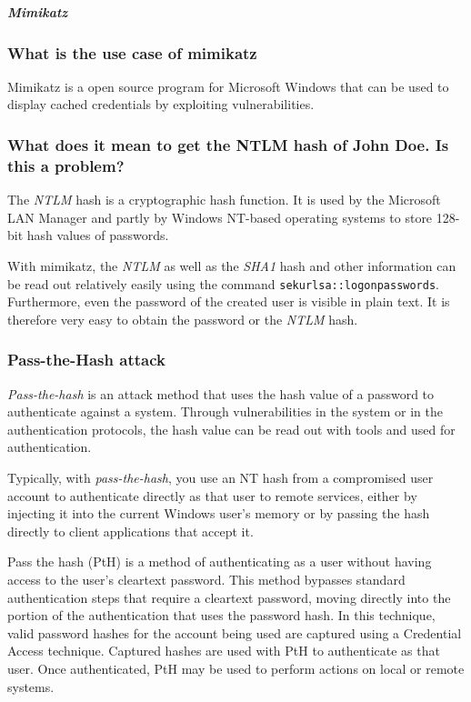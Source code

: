 \subparagraph{Mimikatz}
\subsubsection{What is the use case of mimikatz}
Mimikatz is a open source program for Microsoft Windows that can be used to display cached credentials by exploiting vulnerabilities.

\subsubsection{What does it mean to get the NTLM hash of John Doe. Is this a problem?}
The \textit{NTLM} hash is a cryptographic hash function. It is used by the Microsoft LAN Manager and partly by Windows NT-based operating systems to store 128-bit hash values of passwords.

With mimikatz, the \textit{NTLM} as well as the \textit{SHA1} hash and other information can be read out relatively easily using the command \lstinline|sekurlsa::logonpasswords|. Furthermore, even the password of the created user is visible in plain text. It is therefore very easy to obtain the password or the \textit{NTLM} hash.

\subsubsection{Pass-the-Hash attack}
\textit{Pass-the-hash} is an attack method that uses the hash value of a password to authenticate against a system. Through vulnerabilities in the system or in the authentication protocols, the hash value can be read out with tools and used for authentication.

Typically, with \textit{pass-the-hash}, you use an NT hash from a compromised user account to authenticate directly as that user to remote services, either by injecting it into the current Windows user's memory or by passing the hash directly to client applications that accept it.

Pass the hash (PtH) is a method of authenticating as a user without having access to the user's cleartext password. This method bypasses standard authentication steps that require a cleartext password, moving directly into the portion of the authentication that uses the password hash. In this technique, valid password hashes for the account being used are captured using a Credential Access technique. Captured hashes are used with PtH to authenticate as that user. Once authenticated, PtH may be used to perform actions on local or remote systems.

